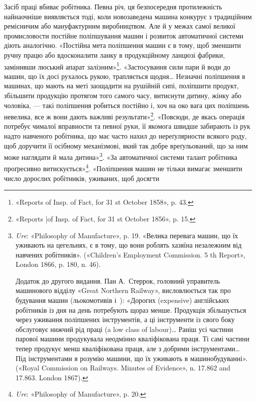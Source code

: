 Засіб праці вбиває робітника. Певна річ, ця безпосередня
протилежність найнаочніше виявляється тоді, коли новозаведена
машина конкурує з традиційним ремісничим або мануфактурним
виробництвом. Але й у межах самої великої промисловости постійне
поліпшування машин і розвиток автоматичної системи діють аналогічно.
«Постійна мета поліпшення машин є в тому, щоб зменшити
ручну працю або вдосконалити ланку в продукційному
ланцюзі фабрики, замінивши люський апарат залізним»\footnote{
«Reports of Insp. of Fact, for 31 st October 1858», p. 43.
}.
«Застосування сили пари й води до машин, що їх досі рухалось
рукою, трапляється щодня\dots{} Незначні поліпшення в машинах,
що мають на меті заощадити на рушійній сипі, поліпшити продукт,
збільшити продукцію протягом того самого часу, витиснути дитину,
жінку або чоловіка, — такі поліпшення робиться постійно
і, хоч на око вага цих поліпшень невелика, все ж вони дають
важливі результати»\footnote{
«Reports |of Insp. of Fact, for 31 st October 1856», p. 15.
}. «Повсюди, де якась операція потребує
чималої вправности та певної руки, її якомога швидше забирають
із рук надто навченого робітника, що має часто нахил до нереґулярности
всякого роду, щоб доручити її осібному механізмові,
який так добре вреґульований, що за ним може наглядати й
мала дитина»\footnote{
\emph{Ure}: «Philosophy of Manufacture», p. 19. «Велика перевага
машин, що їх уживають на цегельнях, є в тому, що вони роблять хазяїна
незалежним від навчених робітників». («Children’s Employment Commission.
5 th Report», London 1866, p. 180, n. 46).

Додаток до другого видання. Пан А.~Стеррок, головний управитель
машинового відділу «Great Northern Railway», висловлюється так про
будування машин (льокомотивів і~): «Дорогих (expensive) англійських
робітників із дня на день потребують щораз менше. Продукція збільшується
через уживання поліпшених інструментів, а ці інструменти із свого
боку обслуговує нижчий рід праці (a low class of labour)\dots{} Раніш усі частини
парової машини продукувала неодмінно кваліфікована праця.
Ті самі частини тепер продукує менш кваліфікована праця, але з добрими
інструментами\dots{} Під інструментами я розумію машини, що їх уживають
в машинобудуванні». («Royal Commission on Railways. Minutes of Evidence»,
n. \num{17.862} and \num{17.863}. London 1867).
}. «За автоматичної системи талант робітника проґресивно
витискується»\footnote{
\emph{Ure}: «Philosophy of Manufacture», p. 20.
}. «Поліпшення машин не тільки вимагає
зменшити число дорослих робітників, уживаних, щоб досягти
